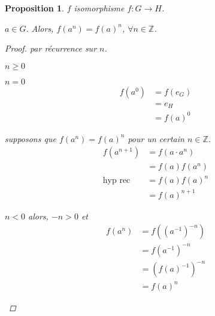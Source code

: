 \documentclass{report}
\newcommand*{\gte}{\geqslant}
\newcommand*{\entiers}{\mathbb{Z}}
\newtheorem*{prop}{Proposition}
\theoremstyle{definition}
\theoremstyle{remark}
\begin{document}
	\begin{prop}
		$f$ isomorphisme $f:G \to H$.

		$a \in G$. Alors, $f(a^n)=f(a)^n$, $\forall n \in \entiers$.
		\begin{proof}
			par r\'ecurrence sur $n$.

			\begin{ulist}
				\item[$n\gte 0$]
				\begin{nlist}
					\item $n=0$
					\begin{align*}
						f(a^0)&= f(e_G)\\
						&= e_H\\
						&= f(a)^0
					\end{align*}
					\item supposons que $f(a^n)=f(a)^n$ pour un certain $n \in \entiers$.
					\begin{align*}
						f(a^{n+1})&= f(a \cdot a^n)\\
						&= f(a)f(a^n)\\
						\text{hyp rec}&= f(a)f(a)^n\\
						&= f(a)^{n+1}
					\end{align*}
				\end{nlist}
				\item[$n<0$] alors, $-n>0$ et
				\begin{align*}
					f(a^n)&= f((a^{-1})^{-n})\\
					&= f(a^{-1})^{-n}\\
					&= (f(a)^{-1})^{-n}\\
					&= f(a)^n
				\end{align*}
			\end{ulist}
		\end{proof}
	\end{prop}
\end{document}
